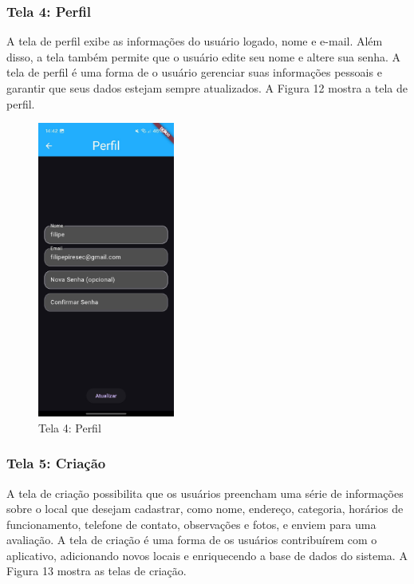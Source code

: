     \FloatBarrier

\subsubsection{Tela 4: Perfil}

    A tela de perfil exibe as informações do usuário logado, nome e e-mail. Além disso, a tela também permite que o usuário edite seu nome e altere sua senha. A tela de perfil é uma forma de o usuário gerenciar suas informações pessoais e garantir que seus dados estejam sempre atualizados. A Figura 12 mostra a tela de perfil.

    \begin{figure}[h]
        \centering
        \includegraphics[width=0.4\textwidth]{imagens/perfil.jpg}
        \caption{\scriptsize Tela 4: Perfil}
        \label{fig:tela4}
    \end{figure}

    \FloatBarrier

\subsubsection{Tela 5: Criação}

    A tela de criação possibilita que os usuários preencham uma série de informações sobre o local que desejam cadastrar, como nome, endereço, categoria, horários de funcionamento, telefone de contato, observações e fotos, e enviem para uma avaliação. A tela de criação é uma forma de os usuários contribuírem com o aplicativo, adicionando novos locais e enriquecendo a base de dados do sistema. A Figura 13 mostra as telas de criação.

